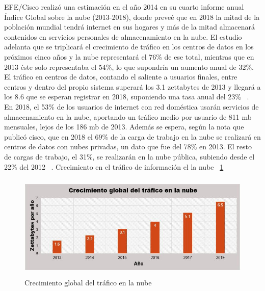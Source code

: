 EFE/Cisco realizó una estimación en el año 2014 en su cuarto informe anual Índice Global sobre la nube (2013-2018), donde preveé que en 2018 la mitad de la población mundial tendrá internet en sus hogares y más de la mitad almacenará contenidos en servicios personales de almacenamiento en la nube. El estudio adelanta que se triplicará el crecimiento de tráfico en los centros de datos en los próximos cinco años y la nube representará el 76\% de ese total, mientras que en 2013 éste solo representaba el 54\%, lo que supondría un aumento anual de 32\%. El tráfico en centros de datos, contando el saliente a usuarios finales, entre centros y dentro del propio sistema superará los 3.1 zettabytes de 2013 y llegará a los 8.6 que se esperan registrar en 2018, suponiendo una tasa anual del 23\% ~\cite{cisco}. 
\\ 
En 2018, el 53\% de los usuarios de internet con red doméstica usarán servicios de almacenamiento en la nube, aportando un tráfico medio por usuario de 811 mb mensuales, lejos de los 186 mb de 2013. Además se espera, según la nota que publicó cisco, que en 2018 el 69\% de la carga de trabajo en la nube se realizará en centros de datos con nubes privadas, un dato que fue del 78\% en 2013. El resto de cargas de trabajo, el 31\%, se realizarán en la nube pública, subiendo desde el 22\% del 2012 ~\cite{cisco}. Crecimiento en el tráfico de información el la nube ~\ref{fig:1-2-1} \\

\begin{figure}[H]
\centering
	\includegraphics[width=13cm, height=5cm]{./images/crecimientoNube.jpg}
	\caption{Crecimiento global del tráfico en la nube}
	\label{fig:1-2-1}
\end{figure}

